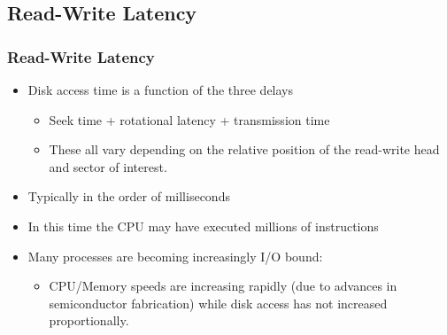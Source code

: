 \documentclass{beamer}
\begin{document}
\subsection{Read-Write Latency}
\begin{frame}
\frametitle{Read-Write Latency}
\begin{itemize}
\item Disk access time is a  function of the three delays
\begin{itemize}
\item Seek time + rotational latency + transmission time
\item These all vary depending on the relative position of the read-write head and sector of interest.
\end{itemize}
\item Typically in the order of milliseconds
\item In this time the CPU may have executed millions of instructions 
\item Many processes are becoming increasingly I/O bound:
\begin{itemize}
\item CPU/Memory speeds are increasing rapidly (due to advances in semiconductor fabrication) while disk access has not increased proportionally.
\end{itemize}
\end{itemize}
\end{frame}
\end{document}
